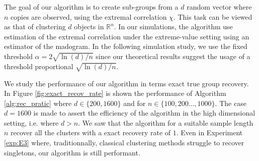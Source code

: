 \documentclass[11pt]{article}
\theoremstyle{definition}
\begin{document}
    The goal of our algorithm is to create sub-groups from a $d$ random vector where $n$ copies are observed, using the extremal correlation $\chi$. This task can be viewed as that of clustering $d$ objects in $\mathbb{R}^n$. In our simulations, the algorithm use estimation of the extremal correlation under the extreme-value setting using an estimator of the madogram. In the following simulation study, we use the fixed threshold $\alpha = 2 \sqrt{\ln(d)/n}$ since our theoretical results suggest the usage of a threshold proportional $\sqrt{\ln(d)/n}$. 
    
    We study the performance of our algorithm in terms exact true group recovery. In Figure \ref{fig:exact_recov_rate} is shown the performance of Algorithm \ref{alg:rec_pratic} where $d \in \{200,1600\}$ and for $n \in \{100,200\dots, 1000\}$. The case $d = 1600$ is made to assert the efficiency of the algorithm in the high dimensional setting, i.e. where $d > n$. We saw that the algorithm for a suitable sample length $n$ recover all the clusters with a exact recovery rate of $1$. Even in Experiment \ref{exp:E3} where, traditionnally, classical clustering methods struggle to recover singletons, our algorithm is still performant.
    
\end{document}
